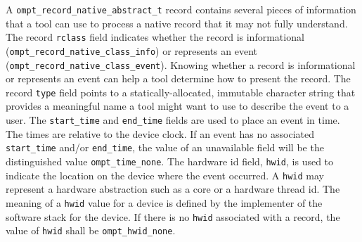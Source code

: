 A  \verb|ompt_record_native_abstract_t| record contains several
pieces of information that a tool can use to process a native record
that it may not fully understand. The record \verb|rclass| field
indicates whether the record is informational
(\verb|ompt_record_native_class_info|) or represents an event
(\verb|ompt_record_native_class_event|). Knowing whether a record
is informational or represents an event can help a tool determine
how to present the record. The record  \verb|type| field points to
a statically-allocated, immutable character string that provides
a meaningful name  a tool might want to use to describe the event
to a user. The \verb|start_time| and \verb|end_time| fields are
used to place an event in time. The times are relative to the device
clock. If an event has no associated \verb|start_time| and/or
\verb|end_time|, the value of an unavailable field will be the
distinguished value \verb|ompt_time_none|. The hardware id field,
\verb|hwid|,  is used to indicate the location on the device where
the event occurred. A \verb|hwid| may represent a hardware abstraction
such as a core or a hardware thread id. The meaning of a \verb|hwid|
value for a device is defined by the implementer of the software
stack for the device. If there is no \verb|hwid| associated with a
record, the value of \verb|hwid| shall be \verb|ompt_hwid_none|.


